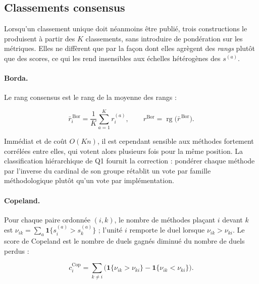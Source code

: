 \documentclass[11pt,a4paper]{article}
\theoremstyle{definition}
\theoremstyle{remark}
\newcommand{\ind}[1]{\mathbf{1}\{#1\}}
\newcommand{\rg}{\operatorname{rg}}
\begin{document}
\bigskip

\subsection{Classements consensus}
\label{sec:consensus}

\medskip

Lorsqu'un classement unique doit néanmoins être publié, trois constructions le produisent à
partir des $K$ classements, sans introduire de pondération sur les métriques. Elles ne
diffèrent que par la façon dont elles agrègent des \emph{rangs} plutôt que des scores, ce
qui les rend insensibles aux échelles hétérogènes des $s^{(a)}$.

\bigskip

\paragraph{Borda.} Le rang consensus est le rang de la moyenne des rangs
\citep{borda1781} :

\medskip

\[
  \bar{r}^{\,\mathrm{Bor}}_i = \frac{1}{K}\sum_{a=1}^{K} r^{(a)}_i,
  \qquad
  r^{\mathrm{Bor}} = \rg\big(\bar{r}^{\,\mathrm{Bor}}\big).
\]

\bigskip

Immédiat et de coût $O(Kn)$, il est cependant sensible aux méthodes fortement corrélées
entre elles, qui votent alors plusieurs fois pour la même position. La classification
hiérarchique de Q1 fournit la correction : pondérer chaque méthode par l'inverse du cardinal
de son groupe rétablit un vote par famille méthodologique plutôt qu'un vote par
implémentation.

\bigskip

\paragraph{Copeland.} Pour chaque paire ordonnée $(i,k)$, le nombre de méthodes plaçant $i$
devant $k$ est $\nu_{ik} = \sum_a \ind{s^{(a)}_i > s^{(a)}_k}$ ; l'unité $i$ remporte le
duel lorsque $\nu_{ik} > \nu_{ki}$. Le score de Copeland \citep{copeland1951} est le nombre
de duels gagnés diminué du nombre de duels perdus :

\medskip

\[
  c^{\mathrm{Cop}}_i = \sum_{k \ne i}
    \Big(\ind{\nu_{ik} > \nu_{ki}} - \ind{\nu_{ik} < \nu_{ki}}\Big).
\]
\end{document}
